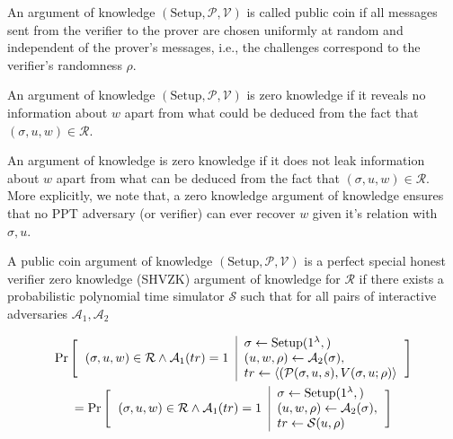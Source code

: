 \begin{defn}
    An argument of knowledge  $(\text{Setup}, \mathcal{P}, \mathcal{V})$ is called public coin if all messages sent from the verifier to the prover are chosen uniformly at random and independent of the prover's messages, i.e., the challenges correspond to the verifier's randomness $\rho$.
\end{defn}

\begin{defn}
    An argument of knowledge $(\text{Setup}, \mathcal{P}, \mathcal{V})$ is zero knowledge if it reveals no information about $w$ apart from what could be deduced from the fact that $(\sigma, u, w) \in \mathcal{R}$.
\end{defn}

An argument of knowledge is zero knowledge if it does not leak information about $w$ apart from what can be deduced from the fact that $(\sigma, u, w) \in \mathcal{R}$. More explicitly, we note that, a zero knowledge argument of knowledge ensures that no \textsf{PPT} adversary (or verifier) can ever recover $w$ given it's relation with $\sigma, u$.

\begin{defn}
    A public coin argument of knowledge $(\text{Setup}, \mathcal{P}, \mathcal{V})$ is a perfect special honest verifier zero knowledge (SHVZK) argument of knowledge for $\mathcal{R}$ if there exists a probabilistic polynomial time simulator $\mathcal{S}$ such that for all pairs of interactive adversaries $\mathcal{A}_1 , \mathcal{A}_2$
    
    \begin{multline*}
    \Pr
    \Bigg[
    \begin{tabular}{c | l}
        \multirow{3}{*}{$(\sigma, u, w) \in \mathcal{R} \wedge \mathcal{A}_1(tr) = 1$}
         & $\sigma \leftarrow \text{Setup}(1^{\lambda},)$
         \\
         & 
         $(u, w, \rho) \leftarrow \mathcal{A}_2(\sigma),$
         \\
         & $tr \leftarrow \langle (\mathcal{P}(\sigma, u, s), V(\sigma, u; \rho) \rangle$
    \end{tabular}
    \Bigg]
    \\
    =\Pr
    \Bigg[
    \begin{tabular}{c | l}
        \multirow{3}{*}{$(\sigma, u, w) \in \mathcal{R} \wedge \mathcal{A}_1(tr) = 1$}
         & $\sigma \leftarrow \text{Setup}(1^{\lambda},)$
         \\
         & 
         $(u, w, \rho) \leftarrow \mathcal{A}_2(\sigma),$
         \\
         & $tr \leftarrow \mathcal{S}(u, \rho)$
    \end{tabular}
    \Bigg]
    \end{multline*}

\end{defn}

